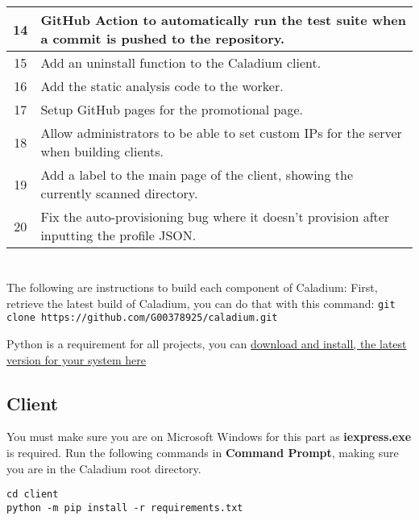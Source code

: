 \begin{appendices}
\begin{tabular}{|c|p{14cm}|}
    \hline
    14 & GitHub Action to automatically run the test suite
    when a commit is pushed to the repository. \\
    \hline
    15 & Add an uninstall function to the Caladium client. \\
    \hline
    16 & Add the static analysis code to the worker. \\
    \hline
    17 & Setup GitHub pages for the promotional page. \\
    \hline
    18 & Allow administrators to be able to set custom IPs
    for the server when building clients. \\
    \hline
    19 & Add a label to the main page of the client,
    showing the currently scanned directory. \\
    \hline
    20 & Fix the auto-provisioning bug where it doesn't
    provision after inputting the profile JSON. \\
\end{tabular}

\renewcommand{\chaptername}{Appendix C}
\renewcommand{\thechapter}{C}
\chapter{}

The following are instructions to build each component of Caladium:
First, retrieve the latest build of Caladium, you can do that with this command:
\texttt{git clone https://github.com/G00378925/caladium.git}

Python is a requirement for all projects, you can
\href{https://www.python.org/downloads/}{download and install, the latest version for your system here}

\section{Client}
You must make sure you are on Microsoft Windows
for this part as \textbf{iexpress.exe} is required.
Run the following commands in \textbf{Command Prompt},
making sure you are in the Caladium root directory.

\begin{lstlisting}
cd client
python -m pip install -r requirements.txt


\end{lstlisting}
\end{appendices}
